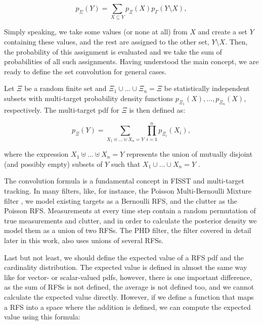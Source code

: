 \begin{equation}
    p_\Sigma(Y) = \sum_{X \subseteq Y} p_\Xi(X) p_\Gamma(Y \setminus X),
\end{equation}

Simply speaking, we take some values (or none at all) from $X$ and create a set $Y$ containing these values, and the rest are assigned to the other set, $Y \setminus X$. Then, the probability of this assignment is evaluated and we take the sum of probabilities of all such assignments. Having understood the main concept, we are ready to define the set convolution for general cases.

\begin{definition}\label{def:rfs-convolution}
    Let $\Xi$ be a random finite set and $\Xi_1 \cup \ldots \cup \Xi_n = \Xi$ be statistically independent subsets with multi-target probability density functions $p_{\Xi_1}(X), \ldots, p_{\Xi_n}(X)$, respectively. The multi-target pdf for $\Xi$ is then defined as:

    \begin{equation}
        p_\Xi(Y) = \sum_{X_1 \uplus \ldots \uplus X_n = Y} \prod_{i=1}^{n} p_{\Xi_i}(X_i),
    \end{equation}
    
    where the expression $X_1 \uplus \ldots \uplus X_n = Y$ represents the union of mutually disjoint (and possibly empty) subsets of $Y$ such that $X_1 \cup \ldots \cup X_n = Y$ \cite[385--386]{mahlerStatisticalMultisourcemultitargetInformation2007}.
\end{definition}

The convolution formula is a fundamental concept in FISST and multi-target tracking. In many filters, like, for instance, the Poisson Multi-Bernoulli Mixture filter \cite{garcia-fernandezPoissonMultiBernoulliMixture2018}, we model existing targets as a Bernoulli RFS, and the clutter as the Poisson RFS. Measurements at every time step contain a random permutation of true measurements and clutter, and in order to calculate the posterior density we model them as a union of two RFSs. The PHD filter, the filter covered in detail later in this work, also uses unions of several RFSs.

Last but not least, we should define the expected value of a RFS pdf and the cardinality distribution. The expected value is defined in almost the same way like for vector- or scalar-valued pdfs, however, there is one important difference, as the sum of RFSs is not defined, the average is not defined too, and we cannot calculate the expected value directly. However, if we define a function that maps a RFS into a space where the addition is defined, we can compute the expected value using this formula:


